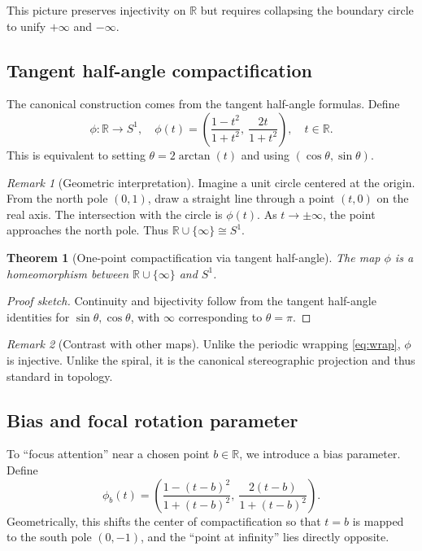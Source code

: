 \documentclass[12pt]{article}
\newtheorem{theorem}{Theorem}
\theoremstyle{remark}
\newtheorem*{remark}{Remark}
\begin{document}
This picture preserves injectivity on $\mathbb{R}$ but requires collapsing the 
boundary circle to unify $+\infty$ and $-\infty$.  

\subsection{Tangent half-angle compactification}
The canonical construction comes from the tangent half-angle formulas. Define
\begin{equation}\label{eq:tangent}
\phi:\mathbb{R}\to S^1, \quad
\phi(t) = \left(\frac{1-t^2}{1+t^2},\ \frac{2t}{1+t^2}\right), \quad t\in\mathbb{R}.
\end{equation}
This is equivalent to setting $\theta = 2\arctan(t)$ and using 
$(\cos\theta,\sin\theta)$. 

\begin{remark}[Geometric interpretation]
Imagine a unit circle centered at the origin. From the north pole $(0,1)$, draw a 
straight line through a point $(t,0)$ on the real axis. The intersection with the 
circle is $\phi(t)$. As $t\to\pm\infty$, the point approaches the north pole. Thus 
$\mathbb{R}\cup\{\infty\}\cong S^1$.
\end{remark}

\begin{theorem}[One-point compactification via tangent half-angle]\label{thm:tangent}
The map $\phi$ is a homeomorphism between $\mathbb{R}\cup\{\infty\}$ and $S^1$.  
\end{theorem}

\begin{proof}[Proof sketch]
Continuity and bijectivity follow from the tangent half-angle identities for 
$\sin\theta,\cos\theta$, with $\infty$ corresponding to $\theta=\pi$.  
\end{proof}

\begin{remark}[Contrast with other maps]
Unlike the periodic wrapping \eqref{eq:wrap}, $\phi$ is injective. Unlike the spiral, 
it is the canonical stereographic projection and thus standard in topology.  
\end{remark}

\subsection{Bias and focal rotation parameter}
To “focus attention” near a chosen point $b\in\mathbb{R}$, we introduce a bias 
parameter. Define
\begin{equation}\label{eq:bias}
\phi_b(t) = \left(\frac{1-(t-b)^2}{1+(t-b)^2},\ \frac{2(t-b)}{1+(t-b)^2}\right).
\end{equation}
Geometrically, this shifts the center of compactification so that $t=b$ is mapped 
to the south pole $(0,-1)$, and the “point at infinity” lies directly opposite.  
\end{document}
